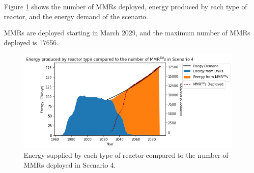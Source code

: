 Figure \ref{fig:energy_rx_4} shows the number of \glspl{MMR} deployed, 
energy produced by each type of reactor, and the energy demand of the 
scenario. 

\glspl{MMR} are deployed starting in March 2029, and the maximum number 
of \glspl{MMR} deployed is 17656. 

\begin{figure}
    \centering 
    \includegraphics[scale=0.5]{figures/energy_scenario4.png}
    \caption{Energy supplied by each type of reactor compared to the number of 
    \glspl{MMR} deployed in Scenario 4.}
    \label{fig:energy_rx_4}
\end{figure}


